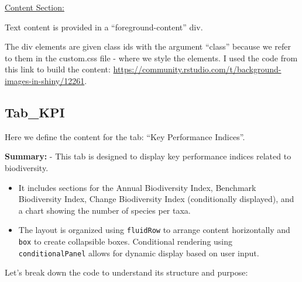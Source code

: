 \documentclass[
]{book}
\begin{document}
\ul{Content Section:}

Text content is provided in a ``foreground-content'' div.

The div elements are given class ids with the argument ``class'' because we refer to them in the custom.css file - where we style the elements. I used the code from this link to build the content: \url{https://community.rstudio.com/t/background-images-in-shiny/12261}.

\hypertarget{tab_kpi}{%
\subsection{Tab\_KPI}\label{tab_kpi}}

Here we define the content for the tab: ``Key Performance Indices''.

\textbf{Summary:}
- This tab is designed to display key performance indices related to biodiversity.

\begin{itemize}
\item
  It includes sections for the Annual Biodiversity Index, Benchmark Biodiversity Index, Change Biodiversity Index (conditionally displayed), and a chart showing the number of species per taxa.
\item
  The layout is organized using \texttt{fluidRow} to arrange content horizontally and \texttt{box} to create collapsible boxes. Conditional rendering using \texttt{conditionalPanel} allows for dynamic display based on user input.
\end{itemize}

Let's break down the code to understand its structure and purpose:
\end{document}
